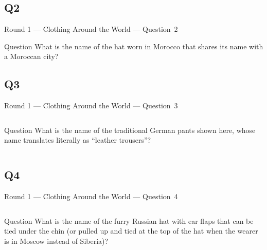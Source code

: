 \documentclass[11pt]{beamer}
\begin{document}
\subsection*{Q2}
\begin{frame}[t]{Round 1 --- Clothing Around the World --- \mbox{Question 2}}
\vspace{-0.5em}
\begin{block}{Question}
What is the name of the hat worn in Morocco that shares its name with a Moroccan city?
\end{block}
\end{frame}
\subsection*{Q3}
\begin{frame}[t]{Round 1 --- Clothing Around the World --- \mbox{Question 3}}
\vspace{-0.5em}
\begin{columns}[T,totalwidth=\linewidth]
\begin{column}{0.37\linewidth}
\begin{block}{Question}
What is the name of the traditional German pants shown here, whose name translates literally as ``leather trousers''?
\end{block}
\end{column}
\begin{column}{0.62\linewidth}
\begin{center}
\texttt{[image: \{Images/lederhosen]}.jpg}
\end{center}
\end{column}
\end{columns}
\end{frame}
\subsection*{Q4}
\begin{frame}[t]{Round 1 --- Clothing Around the World --- \mbox{Question 4}}
\vspace{-0.5em}
\begin{columns}[T,totalwidth=\linewidth]
\begin{column}{0.37\linewidth}
\begin{block}{Question}
What is the name of the furry Russian hat with ear flaps that can be tied under the chin (or pulled up and tied at the top of the hat when the wearer is in Moscow instead of Siberia)?
\end{block}
\end{column}
\begin{column}{0.62\linewidth}
\begin{center}
\texttt{[image: \{Images/ushanka]}.jpeg}
\end{center}
\end{column}
\end{columns}
\end{frame}
\end{document}
